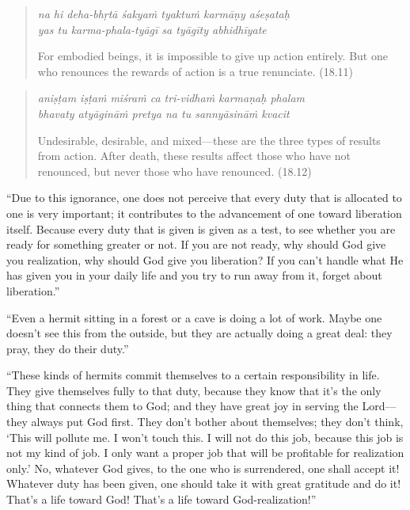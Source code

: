 \documentclass[12pt, twoside, openright]{memoir}
\begin{document}
\par
\begin{verse}
\textit{na hi deha-bhṛtā śakyaṁ tyaktuṁ karmāṇy aśeṣataḥ} \\
\textit{yas tu karma-phala-tyāgī sa tyāgīty abhidhīyate}

\noindent For embodied beings, it is impossible to give up action entirely. But one who renounces the rewards of action is a true renunciate. (18.11)
\end{verse}
\par



\par
\begin{verse}
\textit{aniṣṭam iṣṭaṁ miśraṁ ca tri-vidhaṁ karmaṇaḥ phalam} \\
\textit{bhavaty atyāgināṁ pretya na tu sannyāsināṁ kvacit}

\noindent Undesirable, desirable, and mixed---these are the three types of results from action. After death, these results affect those who have not renounced, but never those who have renounced. (18.12)
\end{verse}
\par


\enquote{Due to this ignorance, one does not perceive that every duty that is allocated to one is very important; it contributes to the advancement of one toward liberation itself. Because every duty that is given is given as a test, to see whether you are ready for something greater or not. If you are not ready, why should God give you realization, why should God give you liberation? If you can’t handle what He has given you in your daily life and you try to run away from it, forget about liberation.}

\enquote{Even a hermit sitting in a forest or a cave is doing a lot of work. Maybe one doesn’t see this from the outside, but they are actually doing a great deal: they pray, they do their duty.}

\enquote{These kinds of hermits commit themselves to a certain responsibility in life. They give themselves fully to that duty, because they know that it’s the only thing that connects them to God; and they have great joy in serving the Lord---they always put God first. They don’t bother about themselves; they don’t think, \enquote{This will pollute me. I won’t touch this. I will not do this job, because this job is not my kind of job. I only want a proper job that will be profitable for realization only.} No, whatever God gives, to the one who is surrendered, one shall accept it! Whatever duty has been given, one should take it with great gratitude and do it! That’s a life toward God! That’s a life toward God-realization!}
\end{document}
